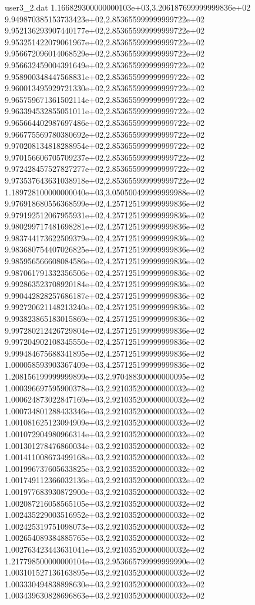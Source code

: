 \begin{filecontents}{user3_2.dat}
1.166829300000000103e+03,3.206187699999999836e+02
9.949870385153733423e+02,2.853655999999999722e+02
9.952136293907440177e+02,2.853655999999999722e+02
9.953251422079061967e+02,2.853655999999999722e+02
9.956672096014068529e+02,2.853655999999999722e+02
9.956632459004391649e+02,2.853655999999999722e+02
9.958900348447568831e+02,2.853655999999999722e+02
9.960013495929721330e+02,2.853655999999999722e+02
9.965759671361502114e+02,2.853655999999999722e+02
9.963394532855051011e+02,2.853655999999999722e+02
9.965664402987697486e+02,2.853655999999999722e+02
9.966775569780380692e+02,2.853655999999999722e+02
9.970208134818288954e+02,2.853655999999999722e+02
9.970156606705709237e+02,2.853655999999999722e+02
9.972428457527827277e+02,2.853655999999999722e+02
9.973537643631038918e+02,2.853655999999999722e+02
1.189728100000000040e+03,3.050500499999999988e+02
9.976918680556368599e+02,4.257125199999999836e+02
9.979192512067955931e+02,4.257125199999999836e+02
9.980299717481698281e+02,4.257125199999999836e+02
9.983744173622509379e+02,4.257125199999999836e+02
9.983680754407026825e+02,4.257125199999999836e+02
9.985956566608084586e+02,4.257125199999999836e+02
9.987061791332356506e+02,4.257125199999999836e+02
9.992863523708920184e+02,4.257125199999999836e+02
9.990442828257686187e+02,4.257125199999999836e+02
9.992720621148213240e+02,4.257125199999999836e+02
9.993823865183015869e+02,4.257125199999999836e+02
9.997280212426729804e+02,4.257125199999999836e+02
9.997204902108345550e+02,4.257125199999999836e+02
9.999484675688341895e+02,4.257125199999999836e+02
1.000058593903367409e+03,4.257125199999999836e+02
1.208156199999999899e+03,2.970488300000000095e+02
1.000396697595900378e+03,2.921035200000000032e+02
1.000624873022847169e+03,2.921035200000000032e+02
1.000734801288433346e+03,2.921035200000000032e+02
1.001081625123094909e+03,2.921035200000000032e+02
1.001072904980966314e+03,2.921035200000000032e+02
1.001301278476860034e+03,2.921035200000000032e+02
1.001411008673499168e+03,2.921035200000000032e+02
1.001996737605633825e+03,2.921035200000000032e+02
1.001749112366032136e+03,2.921035200000000032e+02
1.001977683930872900e+03,2.921035200000000032e+02
1.002087216058565105e+03,2.921035200000000032e+02
1.002435229003516952e+03,2.921035200000000032e+02
1.002425319751098073e+03,2.921035200000000032e+02
1.002654089384885765e+03,2.921035200000000032e+02
1.002763423443631041e+03,2.921035200000000032e+02
1.217798500000000104e+03,2.953665799999999990e+02
1.003101527136163895e+03,2.921035200000000032e+02
1.003330494838898630e+03,2.921035200000000032e+02
1.003439630828696863e+03,2.921035200000000032e+02

\end{filecontents}
